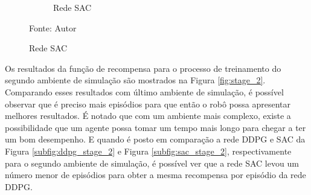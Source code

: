 \begin{figure}[H]
\begin{center}
\begin{subfigure}[b]{0.60\textwidth}
\begin{subfigure}[b]{0.24\textwidth}
        \end{subfigure}
        \caption{Rede SAC}
        \label{subfig:simulated_env2_sac}
    \end{subfigure}
    \label{fig:sim_env2}
    \end{center}
\small{Fonte: Autor}
\end{figure}

Os resultados da função de recompensa para o processo de treinamento do segundo ambiente de simulação são mostrados na Figura \ref{fig:stage_2}. 
Comparando esses resultados com último ambiente de simulação, é possível observar que é preciso mais episódios para que então o robô possa apresentar melhores resultados.
É notado que com um ambiente mais complexo, existe a possibilidade que um agente possa tomar um tempo mais longo para chegar a ter um bom desempenho.
E quando é posto em comparação a rede DDPG e SAC da Figura \ref{subfig:ddpg_stage_2} e Figura \ref{subfig:sac_stage_2}, respectivamente para o segundo ambiente de simulação, é possível ver que a rede SAC levou um número menor de episódios para obter a mesma recompensa por episódio da rede DDPG. 

